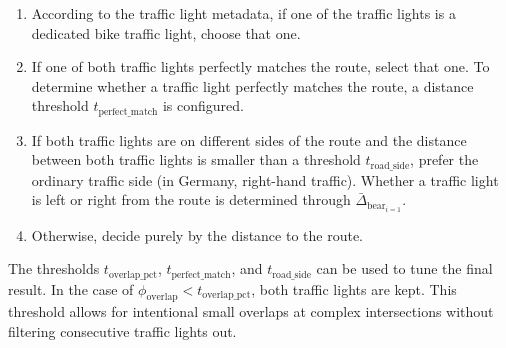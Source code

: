 \begin{enumerate}
    \item According to the traffic light metadata, if one of the traffic lights is a dedicated bike traffic light, choose that one.
    \item If one of both traffic lights perfectly matches the route, select that one. To determine whether a traffic light perfectly matches the route, a distance threshold $t_{\text{perfect\_match}}$ is configured.
    \item If both traffic lights are on different sides of the route and the distance between both traffic lights is smaller than a threshold $t_{\text{road\_side}}$, prefer the ordinary traffic side (in Germany, right-hand traffic). Whether a traffic light is left or right from the route is determined through $\bar{\Delta}_{\text{bear}_{i=1}}$.
    \item Otherwise, decide purely by the distance to the route.
\end{enumerate}

The thresholds $t_{\text{overlap\_pct}}$, $t_{\text{perfect\_match}}$, and $t_{\text{road\_side}}$ can be used to tune the final result. In the case of $\phi_{\text{overlap}} < t_{\text{overlap\_pct}}$, both traffic lights are kept. This threshold allows for intentional small overlaps at complex intersections without filtering consecutive traffic lights out.

